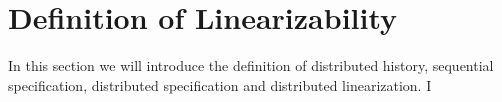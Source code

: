 

\section{Definition of Linearizability}
\label{sec:definition of linearizability}


In this section we will introduce the definition of distributed history, sequential specification, distributed specification and distributed linearization. I

